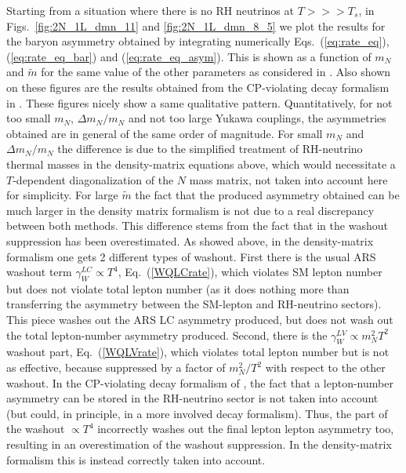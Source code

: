 \documentclass[prd,twocolumn,superscriptaddress,preprintnumbers,nofootinbib,
noshowpacs,groupedaddress]{revtex4-1} %
\begin{document}
Starting from a situation where there is no RH neutrinos at $T >>> T_s$, in Figs.~\ref{fig:2N_1L_dmn_11} and \ref{fig:2N_1L_dmn_8_5} we plot the results for the baryon asymmetry obtained by integrating numerically Eqs.~(\ref{eq:rate_eq}), (\ref{eq:rate_eq_bar}) and (\ref{eq:rate_eq_asym}). This is shown as a function of $m_N$ and $\tilde{m}$ for the same value of the other parameters as considered in \cite{Hambye:2016sby}.
Also shown on these figures are the results obtained from the CP-violating decay formalism in \cite{Hambye:2016sby}.
These figures nicely show a same qualitative pattern. Quantitatively, for not too small $m_N$,  $\Delta m_N/m_N$ and not too large Yukawa couplings, the asymmetries obtained are in general of the same order of magnitude. For small $m_N$ and $\Delta m_N/m_N$ the difference is due to the simplified treatment of RH-neutrino thermal masses in the density-matrix equations above, which would necessitate a $T$-dependent diagonalization of the $N$ mass matrix, not taken into account here for simplicity.
For large $\tilde{m}$ the fact that the produced asymmetry obtained can be much larger in the density matrix formalism is not due to a real discrepancy between both methods. This difference stems from the fact that in \cite{Hambye:2016sby} the washout suppression has been overestimated.
As showed above, in the density-matrix formalism one gets 2 different types of washout. First there is the usual ARS washout term $\gamma^{LC}_W\propto T^4$, Eq.~(\ref{WQLCrate}), which violates SM lepton number but does not violate total lepton number (as it does nothing more than transferring the asymmetry between the SM-lepton and RH-neutrino sectors). This piece washes out the ARS LC asymmetry produced, but does not wash out the total lepton-number asymmetry produced.  Second, there is the $\gamma^{LV}_W\propto m_N^2 T^2$ washout part, Eq.~(\ref{WQLVrate}), which violates total lepton number but is not as effective, because suppressed by a factor of $m_N^2/T^2$ with respect to the other washout.
In the CP-violating decay formalism of \cite{Hambye:2016sby},  the fact that a lepton-number asymmetry can be stored in the RH-neutrino sector is not taken into account (but could, in principle, in a more involved decay formalism). Thus, the part of the washout $\propto T^4$ incorrectly washes out the final lepton lepton asymmetry too, resulting in an overestimation of the washout suppression. In the density-matrix formalism this is instead correctly taken into account.
\end{document}
